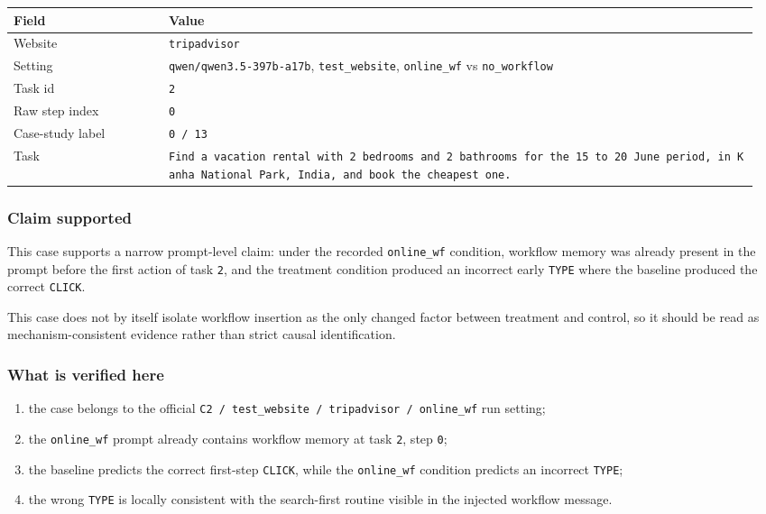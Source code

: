 {\def\LTcaptype{} %
\begin{longtable}[]{@{}>{\raggedright\arraybackslash}p{0.20\linewidth}>{\raggedright\arraybackslash}p{0.76\linewidth}@{}}
\toprule\noalign{}
Field & Value \\
\midrule\noalign{}
\endhead
\bottomrule\noalign{}
\endlastfoot
Website & \texttt{tripadvisor} \\
Setting & \texttt{qwen/qwen3.5-397b-a17b}, \texttt{test\_website},
\texttt{online\_wf} vs \texttt{no\_workflow} \\
Task id & \texttt{2} \\
Raw step index & \texttt{0} \\
Case-study label & \texttt{0\ /\ 13} \\
Task &
\texttt{Find\ a\ vacation\ rental\ with\ 2\ bedrooms\ and\ 2\ bathrooms\ for\ the\ 15\ to\ 20\ June\ period,\ in\ Kanha\ National\ Park,\ India,\ and\ book\ the\ cheapest\ one.} \\
\end{longtable}
}

\subsubsection{Claim supported}

This case supports a narrow prompt-level claim: under the recorded
\texttt{online\_wf} condition, workflow memory was already present in
the prompt before the first action of task \texttt{2}, and the
treatment condition produced an incorrect early \texttt{TYPE} where the
baseline produced the correct \texttt{CLICK}.

This case does not by itself isolate workflow insertion as the only
changed factor between treatment and control, so it should be read as
mechanism-consistent evidence rather than strict causal identification.

\subsubsection{What is verified here}

\begin{enumerate}
\def\labelenumi{\arabic{enumi}.}
\tightlist
\item the case belongs to the official \texttt{C2 / test\_website / tripadvisor / online\_wf} run setting;
\item the \texttt{online\_wf} prompt already contains workflow memory at task \texttt{2}, step \texttt{0};
\item the baseline predicts the correct first-step \texttt{CLICK}, while the \texttt{online\_wf} condition predicts an incorrect \texttt{TYPE};
\item the wrong \texttt{TYPE} is locally consistent with the search-first routine visible in the injected workflow message.
\end{enumerate}


